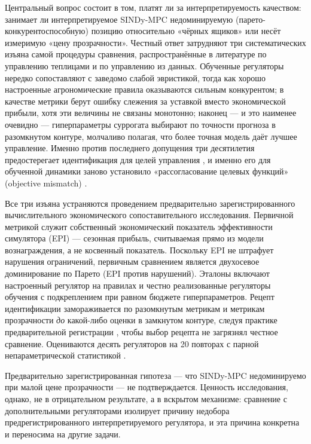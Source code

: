 \documentclass[preprint,3p]{elsarticle}
\begin{document}
Центральный вопрос состоит в том, платят ли за интерпретируемость качеством: занимает ли
интерпретируемое SINDy-MPC недоминируемую (парето-конкурентоспособную) позицию относительно
«чёрных ящиков» или несёт измеримую «цену прозрачности». Честный ответ затрудняют три
систематических изъяна самой процедуры сравнения, распространённые в литературе по управлению
теплицами и по управлению из данных. Обученные регуляторы нередко сопоставляют с заведомо
слабой эвристикой, тогда как хорошо настроенные агрономические правила оказываются сильным
конкурентом; в качестве метрики берут ошибку слежения за уставкой вместо экономической
прибыли, хотя эти величины не связаны монотонно; наконец — и это наименее очевидно —
гиперпараметры суррогата выбирают по точности прогноза в разомкнутом контуре, молчаливо
полагая, что более точная модель даёт лучшее управление. Именно против последнего допущения три
десятилетия предостерегает идентификация для целей управления
\citep{gevers1993,vandenhof1995closedloop}, и именно его для обученной динамики заново
установило «рассогласование целевых функций» (objective mismatch)
\citep{lambert2020objective,jacobiandmd2022}.

Все три изъяна устраняются проведением предварительно зарегистрированного вычислительного
экономического сопоставительного исследования. Первичной метрикой служит собственный
экономический показатель эффективности симулятора (EPI) — сезонная прибыль, считываемая
прямо из модели вознаграждения, а не косвенный показатель. Поскольку EPI не штрафует
нарушения ограничений, первичным сравнением является двухосевое доминирование по Парето (EPI
против нарушений). Эталоны включают настроенный регулятор на правилах и честно реализованные
регуляторы обучения с подкреплением при равном бюджете гиперпараметров. Рецепт идентификации
замораживается по разомкнутым метрикам и метрикам прозрачности \emph{до} какой-либо оценки в
замкнутом контуре, следуя практике предварительной регистрации \citep{pineau2021repro},
чтобы выбор рецепта не загрязнял честное сравнение. Оцениваются десять регуляторов на 20
повторах с парной непараметрической статистикой
\citep{wilcoxon1945,holm1979,efron1994bootstrap}.

Предварительно зарегистрированная гипотеза — что SINDy-MPC недоминируемо при малой цене
прозрачности — не подтверждается. Ценность исследования, однако, не в отрицательном
результате, а в вскрытом механизме: сравнение с дополнительными регуляторами изолирует
причину недобора предрегистрированного интерпретируемого регулятора, и эта причина конкретна
и переносима на другие задачи.
\end{document}
